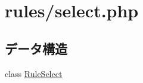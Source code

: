 \hypertarget{select_8php}{
\section{rules/select.php}
\label{select_8php}
}
\subsection*{データ構造}
\begin{DoxyCompactItemize}
\item 
class \hyperlink{class_rule_select}{\-Rule\-Select}
\end{DoxyCompactItemize}
